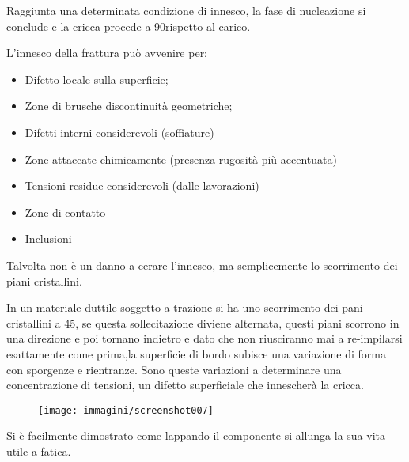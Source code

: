 \documentclass{article}
\begin{document}
\begin{adjustwidth}{2in}{}
		Raggiunta una determinata condizione di innesco, la fase di nucleazione si conclude e la
		cricca procede a 90\degree rispetto al carico. \newline
		
		L'innesco della frattura può avvenire per:
		\begin{itemize}
			\item Difetto locale sulla superficie;
			\item Zone di brusche discontinuità geometriche;
			\item Difetti interni considerevoli (soffiature)
			\item Zone attaccate chimicamente (presenza rugosità più accentuata)
			\item Tensioni residue considerevoli (dalle lavorazioni)
			\item Zone di contatto
			\item Inclusioni
		\end{itemize} 
	
		Talvolta non è un danno a cerare l'innesco, ma semplicemente lo scorrimento dei piani cristallini.
		
		In un materiale duttile soggetto a trazione si ha uno scorrimento dei pani cristallini a 45\degree, se questa sollecitazione diviene alternata, questi piani scorrono in una direzione e poi tornano indietro e dato che non riusciranno mai a re-impilarsi esattamente come prima,la superficie di bordo subisce una variazione di forma con sporgenze e rientranze. Sono queste variazioni a determinare una concentrazione di tensioni, un difetto superficiale che innescherà la cricca. 
		
		\begin{figure}[H]
			\centering
			\texttt{[image: immagini/screenshot007]}
			\label{fig:screenshot007}
		\end{figure}		 
	
		Si è facilmente dimostrato come lappando il componente si allunga la sua vita utile a fatica. \newline
		

\end{adjustwidth}
\end{document}
